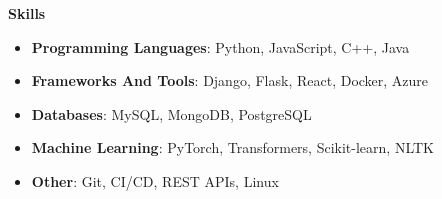 \documentclass[10pt]{article}
\begin{document}
    \noindent \textbf{Skills}
    \begin{itemize}[leftmargin=0.2in]
    
        \item \textbf{Programming Languages}: Python, JavaScript, C++, Java

        \item \textbf{Frameworks And Tools}: Django, Flask, React, Docker, Azure

        \item \textbf{Databases}: MySQL, MongoDB, PostgreSQL

        \item \textbf{Machine Learning}: PyTorch, Transformers, Scikit-learn, NLTK

        \item \textbf{Other}: Git, CI/CD, REST APIs, Linux
\end{itemize}\n
\end{document}
